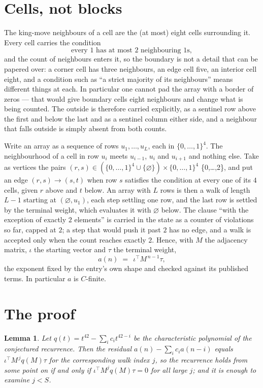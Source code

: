 \documentclass[11pt,a4paper]{article}
\theoremstyle{plain}
\newtheorem{lemma}[theorem]{Lemma}
\theoremstyle{definition}
\begin{document}
\section{Cells, not blocks}

The king-move neighbours of a cell are the (at most) eight cells surrounding it. Every cell
carries the condition
\[
\text{every }1\text{ has at most }2\text{ neighbouring }1\text{s},
\]
and the count of neighbours enters it, so the boundary is not a detail that can be papered
over: a corner cell has three neighbours, an edge cell five, an interior cell eight, and a
condition such as ``a strict majority of its neighbours'' means different things at each. In
particular one cannot pad the array with a border of zeros --- that would give boundary cells
eight neighbours and change what is being counted. The outside is therefore carried
explicitly, as a sentinel row above the first and below the last and as a sentinel column
either side, and a neighbour that falls outside is simply absent from both counts.

Write an array as a sequence of rows $u_1,\dots,u_L$, each in
$\{0,\dots,1\}^{4}$. The neighbourhood of a cell in row $u_i$ meets $u_{i-1}$,
$u_i$ and $u_{i+1}$ and nothing else. Take as vertices the pairs
$(r,s)\in(\{0,\dots,1\}^{4}\cup\{\varnothing\})\times\{0,\dots,1\}^{4}$ \times \{0,\dots,2\},
and put an edge $(r,s)\to(s,t)$ when row $s$ satisfies the condition at every one of its
$4$ cells, given $r$ above and $t$ below. An array with $L$ rows is then a walk of length
$L-1$ starting at $(\varnothing,u_1)$, each step settling one row, and the last row is
settled by the terminal weight, which evaluates it with $\varnothing$ below. The clause ``with the exception of exactly $2$ elements'' is carried in
the state as a counter of violations so far, capped at $2$; a step that would push it past
$2$ has no edge, and a walk is accepted only when the count reaches exactly $2$. Hence,
with $M$ the adjacency matrix, $\iota$ the starting vector and $\tau$ the terminal weight,
\[
a(n)\;=\;\,\iota^{\!\top}M^{\,n-1}\tau ,
\]
the exponent fixed by the entry's own shape and checked against its published terms. In
particular $a$ is $C$-finite.

\section{The proof}

\begin{lemma}\label{lem:crit}
Let $q(t)=t^{42}-\sum_i c_it^{42-i}$ be the characteristic polynomial of the
conjectured recurrence. Then the residual $a(n)-\sum_ic_ia(n-i)$ equals
$\iota^{\!\top}M^{\,j}q(M)\tau$ for the corresponding walk index $j$, so the
recurrence holds from some point on if and only if $\iota^{\!\top}M^{j}q(M)\tau=0$ for all
large $j$; and it is enough to examine $j<S$.
\end{lemma}
\end{document}
